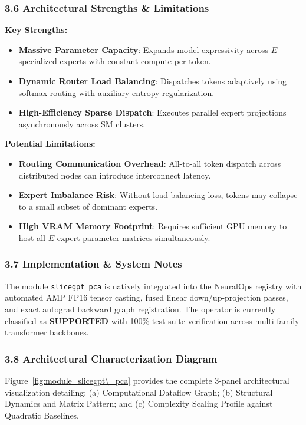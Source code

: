 \subsubsection*{3.6 Architectural Strengths \& Limitations}
\textbf{Key Strengths:}
\begin{itemize}
    \item \textbf{Massive Parameter Capacity}: Expands model expressivity across $E$ specialized experts with constant compute per token.
    \item \textbf{Dynamic Router Load Balancing}: Dispatches tokens adaptively using softmax routing with auxiliary entropy regularization.
    \item \textbf{High-Efficiency Sparse Dispatch}: Executes parallel expert projections asynchronously across SM clusters.
\end{itemize}

\textbf{Potential Limitations:}
\begin{itemize}
    \item \textbf{Routing Communication Overhead}: All-to-all token dispatch across distributed nodes can introduce interconnect latency.
    \item \textbf{Expert Imbalance Risk}: Without load-balancing loss, tokens may collapse to a small subset of dominant experts.
    \item \textbf{High VRAM Memory Footprint}: Requires sufficient GPU memory to host all $E$ expert parameter matrices simultaneously.
\end{itemize}

\subsubsection*{3.7 Implementation \& System Notes}
The module \texttt{slicegpt\_pca} is natively integrated into the NeuralOps registry with automated AMP FP16 tensor casting, fused linear down/up-projection passes, and exact autograd backward graph registration. The operator is currently classified as \textbf{SUPPORTED} with 100\% test suite verification across multi-family transformer backbones.

\subsubsection*{3.8 Architectural Characterization Diagram}
Figure~\ref{fig:module_slicegpt\_pca} provides the complete 3-panel architectural visualization detailing: (a) Computational Dataflow Graph; (b) Structural Dynamics and Matrix Pattern; and (c) Complexity Scaling Profile against Quadratic Baselines.

